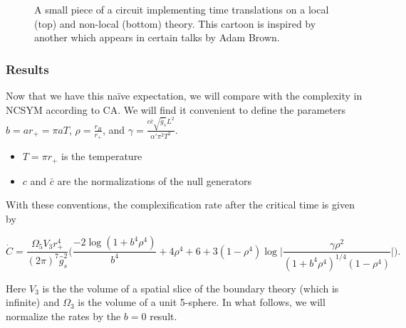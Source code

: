 \documentclass[8pt,aspectratio=169]{beamer}
\begin{document}
\begin{frame}
\begin{minipage}[t]{0.48\linewidth}
\begin{figure}
\begin{center}
    \end{center}
    \caption{A small piece of a circuit implementing time translations on a local (top) and non-local (bottom) theory. This cartoon is inspired by another which appears in certain talks by Adam Brown.}
\end{figure}

\end{minipage}

\end{frame}


\begin{frame}
\frametitle{Results}

Now that we have this na\"ive expectation, we will compare with the complexity in NCSYM according to CA. We will find it convenient to define the parameters $b = a r_+ = \pi a T$,  $\rho = \frac{r_B}{r_+}$, and  $\gamma = \frac{c \bar{c} \sqrt{\bar{g}_s} L^2}{\alpha' \pi^2 T^2}$.
\begin{itemize}

\item $T=\pi r_+$ is the temperature

\item $c$ and $\bar{c}$ are the normalizations of the null generators

\end{itemize}

With these conventions, the complexification rate after the critical time is given by

\begin{equation}
\dot{C} = \frac{\Omega_5 V_3 r_+^4}{(2\pi)^7 \hat{g}_s^2}
\bigg(\frac{-2\log(1+b^4 \rho^4)}{b^4}+4\rho^4+6+3(1-\rho^4)\log\big|\frac{\gamma \rho^2}{(1+b^4 \rho^4)^{1/4}(1-\rho^4)}\big|\bigg).
\end{equation}

Here $V_3$ is the the volume of a spatial slice of the boundary theory (which is infinite) and $\Omega_3$ is the volume of a unit 5-sphere. In what follows, we will normalize the rates by the $b=0$ result. 

\end{frame}
\end{document}
